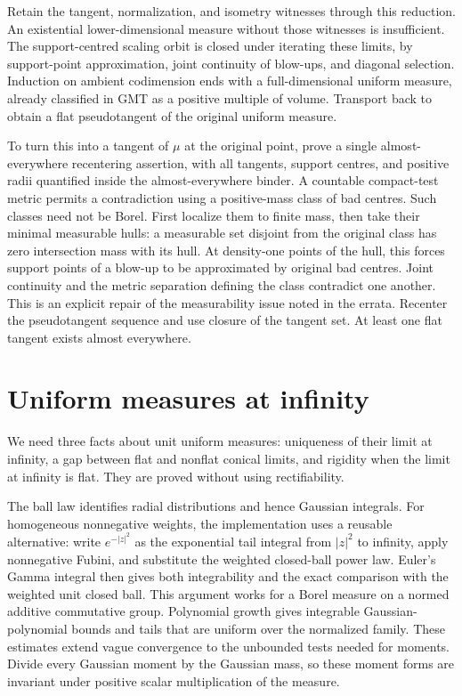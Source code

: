 Retain the tangent, normalization, and isometry witnesses through this
reduction. An existential lower-dimensional measure without those witnesses
is insufficient. The support-centred scaling orbit is closed under iterating
these limits, by support-point approximation, joint continuity of blow-ups,
and diagonal selection. Induction on ambient codimension ends with a
full-dimensional uniform measure, already classified in GMT as a positive
multiple of volume. Transport back to obtain a flat pseudotangent of the
original uniform measure.

To turn this into a tangent of $\mu$ at the original point, prove a single
almost-everywhere recentering assertion, with all tangents, support centres,
and positive radii quantified inside the almost-everywhere binder. A
countable compact-test metric permits a contradiction using a positive-mass
class of bad centres. Such classes need not be Borel. First localize them to finite mass, then take
their minimal measurable hulls: a measurable set disjoint from the original class has zero
intersection mass with its hull. At density-one points of the hull, this
forces support points of a blow-up to be approximated by original bad centres.
Joint continuity and the metric separation defining the class contradict one
another. This is an explicit repair of the measurability issue noted in the
errata. Recenter the pseudotangent sequence and use closure of the tangent
set. At least one flat tangent exists almost everywhere.

\section{Uniform measures at infinity}
We need three facts about unit uniform measures: uniqueness of their limit
at infinity, a gap between flat and nonflat conical limits, and rigidity when
the limit at infinity is flat. They are proved without using rectifiability.

The ball law identifies radial distributions and hence Gaussian integrals.
For homogeneous nonnegative weights, the implementation uses a reusable
alternative: write $e^{-|z|^2}$ as the exponential tail integral from
$|z|^2$ to infinity, apply nonnegative Fubini, and substitute the weighted
closed-ball power law. Euler's Gamma integral then gives both integrability
and the exact comparison with the weighted unit closed ball. This argument
works for a Borel measure on a normed additive commutative group.
Polynomial growth gives integrable Gaussian-polynomial bounds and tails that
are uniform over the normalized family. These estimates extend vague
convergence to the unbounded tests needed for moments. Divide every Gaussian
moment by the Gaussian mass, so these moment forms are invariant under
positive scalar multiplication of the measure.

